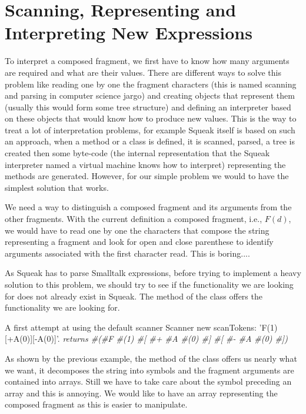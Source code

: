 \section{Scanning, Representing and Interpreting New Expressions}\label{sec:scan}

To interpret a composed fragment, we first have to know how many
arguments are required and what are their values.  There are different
ways to solve this problem like reading one by one the fragment
characters (this is named scanning and parsing in computer science
jargo) and creating objects that represent them (usually this would
form some tree structure) and defining an interpreter based on these
objects that would know how to produce new values. This is the way to
treat a lot of interpretation problems, for example Squeak itself is
based on such an approach, when a method or a class is defined, it is
scanned, parsed, a tree is created then some byte-code (the internal
representation that the Squeak interpreter named a virtual machine
knows how to interpret) representing the methods are generated.
However, for our simple problem we would to have the simplest solution
that works.

We need a way to distinguish a composed fragment and its arguments
from the other fragments. With the current definition a composed
fragment, i.e., $F(d)$, we would have to read one by one the characters
that compose the string representing a fragment and look for open and
close parenthese to identify arguments associated with the first
character read. This is boring....

As Squeak has to parse Smalltalk expressions, before trying to
implement a heavy solution to this problem, we should try to see if
the functionality we are looking for does not already exist in Squeak.
The method  of the class  offers the
functionality we are looking for.

\begin{scriptwithtitle}{A first attempt at using the default scanner}
Scanner new scanTokens: 'F(1)[+A(0)][-A(0)]'.
\emph{returns #(#F #(1) #[ #+ #A #(0) #] #[ #- #A #(0) #])}
\end{scriptwithtitle}


As shown by the previous example, the method  of the
class  offers us nearly what we want, it decomposes the
string into symbols and the fragment arguments are contained into
arrays. Still we have to take care about the symbol preceding an array
and this is annoying. We would like to have an array representing the 
composed fragment as this is easier to manipulate.

